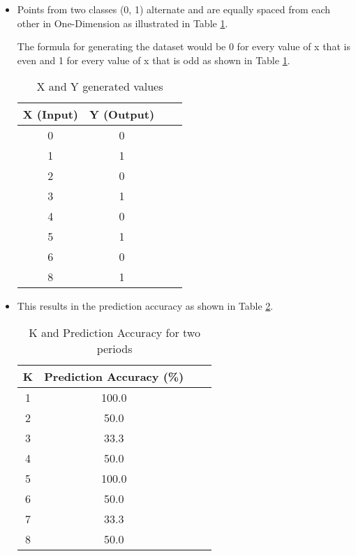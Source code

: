 \documentclass[a4paper,12pt]{article}
\begin{document}
\begin{itemize}
\item Points from two classes (0, 1) alternate and are equally spaced from each other in One-Dimension as illustrated in Table \ref{table:generatedXY}. 

The formula for generating the dataset would be 0 for every value of x that is even and 1 for every value of x that is odd as shown in Table \ref{table:generatedXY}. 

\begin{table}[ht]
\centering %
\begin{tabular}{c c c c} %
\hline %
X (Input) & Y (Output) \\ [0.5ex] 
\hline
0 & 0 \\ 
1 & 1 \\
2 & 0 \\
3 & 1 \\
4 & 0 \\
5 & 1 \\
6 & 0 \\
8 & 1 \\ [1ex] %
\hline
\end{tabular}
\caption{X and Y generated values}\label{table:generatedXY} 
\end{table}
\item This results in the prediction accuracy as shown in Table \ref{table:kAccuracy}.
\begin{table}[ht]
\centering %
\begin{tabular}{c c c c} %
\hline %
K & Prediction Accuracy (\%) \\ [0.5ex] 
\hline
1 & 100.0 \\ 
2 & 50.0 \\
3 & 33.3 \\
4 & 50.0 \\
5 & 100.0 \\
6 & 50.0 \\
7 & 33.3 \\
8 & 50.0 \\ [1ex] %
\hline
\end{tabular}
\caption{K and Prediction Accuracy for two periods}
\label{table:kAccuracy}
\end{table}
\end{itemize}
\end{document}
